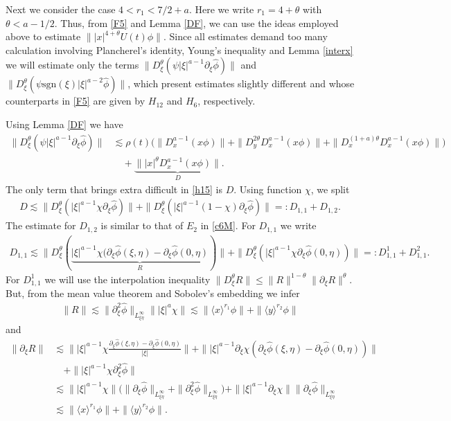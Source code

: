 \documentclass[reqno]{amsart}
\newcommand{\ha}{\hat{\phi}}
\newcommand{\les}{\lesssim}
\newcommand{\lanx}{\langle x \rangle}
\newcommand{\lany}{\langle y \rangle}
\newcommand{\dte}{D^{\theta}_\xi}
\newcommand{\p}{\partial}
\newcommand{\sgn}{\text{sgn}}
\numberwithin{equation}{section}
\begin{document}
Next we consider the case  $4<r_1 <7/2+a$. Here we write  $r_1=4+\theta$ with $\theta<a-1/2$. Thus, from \eqref{F5} and Lemma \ref{DF}, we can use the ideas employed above to estimate $\||x|^{4+\theta}U(t)\phi\|$. Since all estimates demand too many calculation involving  Plancherel's identity, Young's inequality and Lemma \ref{interx} we will estimate only the terms  $\|\dte (\psi |\xi|^{a-1} \p_\xi \ha)\|$ and $\|\dte (\psi \sgn(\xi)|\xi|^{a-2}\ha)\|$, which present estimates slightly different and whose counterparts in \eqref{F5} are given by  $H_{12}$ and $H_{6}$, respectively. 

Using Lemma \ref{DF} we have
\begin{equation}
\begin{split}\label{h15}
\|\dte (\psi |\xi|^{a-1} \p_\xi \ha)\|&\les  \rho(t)\Big(\|D_x^{a-1}(x\phi)\|+\|D_y^{2\theta}D_x^{a-1} (x\phi)\|+\|D_x^{(1+a)\theta}D_x^{a-1}(x\phi)\|\Big)\\
&\quad+\underbrace{\||x|^\theta D_x^{a-1}(x\phi)\|}_{D}.
\end{split}
\end{equation}
The only term that brings extra difficult in \eqref{h15} is $D$. Using function $\chi$, we split
\begin{equation*}
\begin{split}
D \les \|\dte (|\xi|^{a-1}\chi \p_\xi \ha)\|+\|\dte (|\xi|^{a-1}(1-\chi) \p_\xi \ha)\|=:D_{1,1}+D_{1,2}.
\end{split}
\end{equation*}
The estimate for $D_{1,2}$ is similar to that of $E_2$ in \eqref{c6M}. For $D_{1,1}$ we write
\begin{equation*}
\begin{split}
D_{1,1}\les \|\dte (\underbrace{|\xi|^{a-1}\chi (\p_\xi \ha(\xi,\eta)-\p_\xi \ha(0,\eta)}_{R})\|+\|\dte (|\xi|^{a-1}\chi \p_\xi \ha(0,\eta))\|
=:D_{1,1}^1+D_{1,1}^2.
\end{split}
\end{equation*}
For $D_{1,1}^1$ we will use the interpolation inequality $\|D_\xi^\theta R\|\leq \|R\|^{1-\theta}\|\p_\xi R\|^{\theta}$. But, from the mean value theorem and Sobolev's embedding we infer
\begin{equation}
\begin{split}\label{h151}
\|R\|\les \|\p_\xi^2 \ha\|_{L^\infty_{\xi \eta}}\||\xi|^a \chi\|\les \|\lanx^{r_1}\phi\|+\|\lany^{r_2}\phi\|
\end{split}
\end{equation}
and
\begin{equation}
\begin{split}\label{h152}
\|\p_\xi R\|&\les \Big\||\xi|^{a-1}\chi \frac{\p_\xi \ha(\xi,\eta)-\p_\xi\ha(0,\eta)}{|\xi|}\Big\|+\||\xi|^{a-1}\p_\xi \chi (\p_\xi \ha(\xi,\eta)-\p_\xi \ha(0,\eta))\|\\
&\quad+\||\xi|^{a-1}\chi \p_\xi^2 \ha\|\\
&\les \||\xi|^{a-1}\chi\|\big (\|\p_\xi \ha\|_{L^\infty_{\xi \eta}}+\|\p_\xi^2 \ha\|_{L^\infty_{\xi \eta}}\big)+\||\xi|^{a-1}\p_\xi \chi\|\|\p_\xi \ha\|_{L^\infty_{\xi \eta}}\\
&\les\|\lanx^{r_1}\phi\|+\|\lany^{r_2}\phi\|.
\end{split}
\end{equation}
\end{document}
